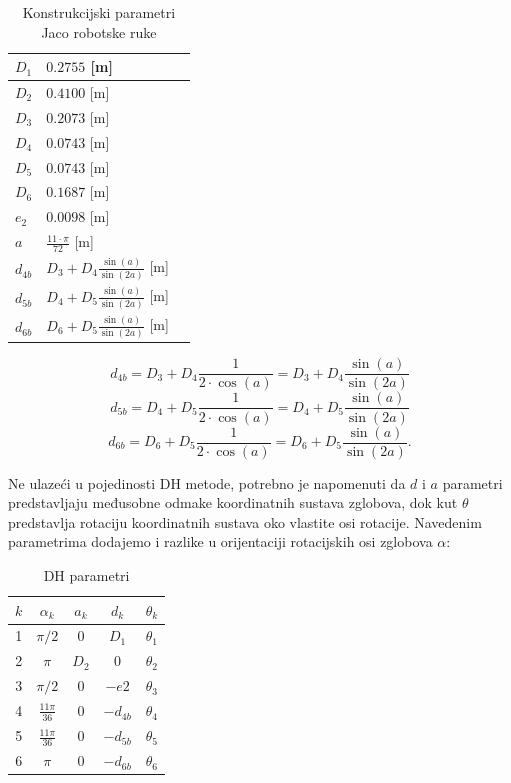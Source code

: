 \documentclass[times, utf8, diplomski, numeric]{fer}
\begin{document}
\begin{table}[h!]
    \centering
    \begin{tabular}{ | l | l | l |}
    \hline
    $D_{1}$ & $0.2755$ [m] \\ \hline
    $D_{2}$  & $0.4100$ [m] \\ \hline
    $D_{3}$  & $0.2073$ [m] \\ \hline
    $D_{4}$  & $0.0743$ [m] \\ \hline
    $D_{5}$  & $0.0743$ [m] \\ \hline
    $D_{6}$  & $0.1687$ [m] \\ \hline
    $e_{2}$  & $0.0098$ [m] \\ \hline
    $a$  & $\frac{11\cdot\pi}{72}$ [m] \\ \hline
    $d_{4b}$  & $D_{3}+D_{4}\frac{\sin(a)}{\sin(2a)}$ [m] \\ \hline
    $d_{5b}$  & $D_{4}+D_{5}\frac{\sin(a)}{\sin(2a)}$ [m] \\ \hline
    $d_{6b}$  & $D_{6}+D_{5}\frac{\sin(a)}{\sin(2a)}$ [m] \\ \hline
    \end{tabular}
    \caption{Konstrukcijski parametri Jaco robotske ruke}
\end{table}

\begin{equation}
d_{4b}=D_{3}+D_{4}\frac{1}{2\cdot\cos(a)}=D_{3}+D_{4}\frac{\sin(a)}{\sin(2a)}
\label{d4b}
\end{equation}
\begin{equation}
d_{5b}=D_{4}+D_{5}\frac{1}{2\cdot\cos(a)}=D_{4}+D_{5}\frac{\sin(a)}{\sin(2a)}
\label{d5b}
\end{equation}
\begin{equation}
d_{6b}=D_{6}+D_{5}\frac{1}{2\cdot\cos(a)}=D_{6}+D_{5}\frac{\sin(a)}{\sin(2a)}. 
\label{d6b}
\end{equation}

Ne ulazeći u pojedinosti DH metode, potrebno je napomenuti da $d$ i $a$ parametri predstavljaju međusobne odmake koordinatnih sustava zglobova, dok kut $\theta$ predstavlja rotaciju koordinatnih sustava oko vlastite osi rotacije. Navedenim parametrima dodajemo i razlike u orijentaciji rotacijskih osi zglobova $\alpha$:\\
 \begin{table}[h!]
\centering
\begin{tabular}{c c c c c}
\hline\hline
$ k $ & $ \alpha_{k} $ & $ a_{k} $ & $ d_{k} $ & $ \theta_{k} $ \\
\hline
1 & $ \pi/2 $ & $ 0 $ & $ D_{1} $ & $ \theta_{1} $\\
2 & $ \pi $ & $ D_{2} $ & 0 & $ \theta_{2} $\\
3 & $ \pi/2 $ & 0 & $ -e2 $ & $ \theta_{3} $\\
4 & $ \frac{11\pi}{36} $ & 0 & $ -d_{4b} $ & $ \theta_{4} $\\
5 & $ \frac{11\pi}{36}  $ & 0 & $ -d_{5b} $ & $ \theta_{5} $\\
6 & $ \pi $ & 0 & $ -d_{6b} $ & $ \theta_{6} $\\
\hline
\end{tabular}
\caption{DH parametri} \label{JacoDH}
\end{table}
\end{document}
